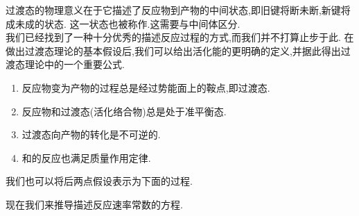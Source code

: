 \documentclass{ctexart}
\begin{document}
\indent 过渡态的物理意义在于它描述了反应物到产物的中间状态,即旧键将断未断,新键将成未成的状态.%
这一状态也被称作.这需要与中间体区分.\vspace{4pt}\\
\indent 我们已经找到了一种十分优秀的描述反应过程的方式,而我们并不打算止步于此.%
在做出过渡态理论的基本假设后,我们可以给出活化能的更明确的定义,并据此得出过渡态理论中的一个重要公式.
\begin{theorem}[7E.2.5 过渡态理论的基本假设]
    \begin{enumerate}[topsep=0pt,parsep=0pt,itemsep=0pt,partopsep=0pt,label=\tbf{\arabic*.},leftmargin=*]
        \item 反应物变为产物的过程总是经过势能面上的鞍点,即过渡态.
        \item 反应物和过渡态(活化络合物)总是处于准平衡态.
        \item 过渡态向产物的转化是不可逆的.
        \item {}和的反应也满足质量作用定律.
    \end{enumerate}
\end{theorem}
我们也可以将后两点假设表示为下面的过程.
\begin{tightcenter}
\end{tightcenter}
现在我们来推导描述反应速率常数的方程.
\end{document}
